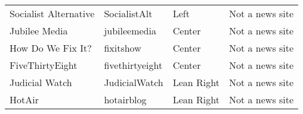 \begin{tabular}{llll}
       Socialist Alternative &     SocialistAlt &          Left &                           Not a news site \\
               Jubilee Media &     jubileemedia &        Center &                           Not a news site \\
           How Do We Fix It? &        fixitshow &        Center &                           Not a news site \\
             FiveThirtyEight &  fivethirtyeight &        Center &                           Not a news site \\
              Judicial Watch &    JudicialWatch &    Lean Right &                           Not a news site \\
                      HotAir &       hotairblog &    Lean Right &                           Not a news site \\
\bottomrule
\end{tabular}
